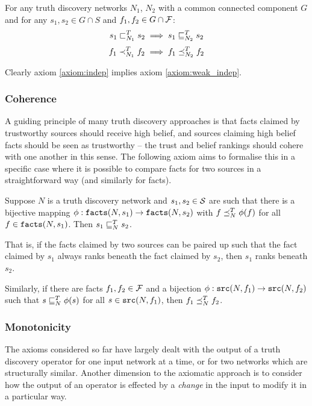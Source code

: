 \documentclass[../main.tex]{subfiles}
\begin{document}
\begin{axiom}
\label{axiom:weak_indep}
For any truth discovery networks $N_1$, $N_2$ with a common connected component
$G$ and for any $s_1, s_2 \in G \cap S$ and $f_1, f_2 \in G \cap \F$:
\[
    s_1 \slt_{N_1}^T s_2 \implies s_1 \sle_{N_2}^T s_2
\]
\[
    f_1 \flt_{N_1}^T f_2 \implies f_1 \fle_{N_2}^T f_2
\]
\end{axiom}

Clearly axiom \ref{axiom:indep} implies axiom \ref{axiom:weak_indep}.

\subsubsection{Coherence}

A guiding principle of many truth discovery approaches is that facts claimed by
trustworthy sources should receive high belief, and sources claiming high
belief facts should be seen as trustworthy -- the trust and belief rankings
should cohere with one another in this sense. The following axiom aims to
formalise this in a specific case where it is possible to compare facts for two
sources in a straightforward way (and similarly for facts).

\begin{axiom}[Coherence]
Suppose $N$ is a truth discovery network and $s_1, s_2 \in \S$ are such that
there is a bijective mapping $\phi: \fact(N, s_1) \rightarrow \fact(N, s_2)$
with $f \fle_N^T \phi(f)$ for all $f \in \fact(N, s_1)$. Then $s_1 \sle_N^T
s_2$.

That is, if the facts claimed by two sources can be paired up such that the
fact claimed by $s_1$ always ranks beneath the fact claimed by $s_2$, then
$s_1$ ranks beneath $s_2$.

Similarly, if there are facts $f_1, f_2 \in \F$ and a bijection $\phi: \src(N,
f_1) \rightarrow \src(N, f_2)$ such that $s \sle_N^T \phi(s)$ for all $s \in
\src(N, f_1)$, then $f_1 \fle_N^T f_2$.

\end{axiom}


\subsubsection{Monotonicity}

The axioms considered so far have largely dealt with the output of a truth
discovery operator for one input network at a time, or for two networks which
are structurally similar. Another dimension to the axiomatic approach is to
consider how the output of an operator is effected by a \emph{change} in the
input to modify it in a particular way.
\end{document}
